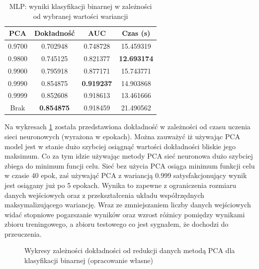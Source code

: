 \documentclass[a4paper, twoside, 11pt, openright]{article}
\begin{document}
\begin{table}[H]
    \centering
    \begin{tabular}{|c|c|c|c|}
    \hline
        \textbf{PCA} & \textbf{Dokładność} &  \textbf{AUC} &  \textbf{Czas (s)} \\ \hline
0.9700               &  0.702948 &  0.748728 &   15.459319 \\ \hline
0.9800               &  0.745125 &  0.821377 &   \textbf{12.693174} \\ \hline
0.9900               &  0.795918 &  0.877171 &   15.743771 \\ \hline
0.9990           &  0.854875 &  \textbf{0.919237} &   14.903868 \\ \hline
0.9999             &  0.852608 &  0.918613 &   13.461666 \\ \hline
Brak                &  \textbf{0.854875} &  0.918459 &   21.490562 \\ \hline

    \end{tabular}
    \caption{MLP: wyniki klasyfikacji binarnej w zależności od wybranej wartości wariancji}
    \label{tab:nn_pca_binary}
\end{table}

Na wykresach \ref{img:nn_pca_binary_vs_accuracy} została przedstawiona dokładność w zależności od czasu uczenia sieci neuronowych (wyrażona w epokach). Można zauważyć iż używając PCA model jest w stanie dużo szybciej osiągnąć wartości dokładności bliskie jego maksimum. Co za tym idzie używając metody PCA sieć neuronowa dużo szybciej zbiega do minimum funcji celu. Sieć bez użycia PCA osiąga minimum funkcji celu w czasie 40 epok, zaś używająć PCA z wariancją 0.999 satysfakcjonujący wynik jest osiągany już po 5 epokach. Wynika to zapewne z ograniczenia rozmiaru danych wejściowych oraz z przekształcenia układu współrzędnych maksymalizującego wariancję. Wraz ze zmniejszaniem liczby danych wejściowych widać stopniowe pogarszanie wyników oraz wzrost różnicy pomiędzy wynikami zbioru treningowego, a zbioru testowego co jest sygnałem, że dochodzi do przeuczenia.


\begin{figure}[H]%
\centering
{}%
\qquad
{}%
\qquad
{}%
\qquad
{}%

\caption{Wykresy zależności dokładności od redukcji danych metodą PCA dla klasyfikacji binarnej (opracowanie własne)}
\label{img:nn_pca_binary_vs_accuracy}
\end{figure}
\end{document}
